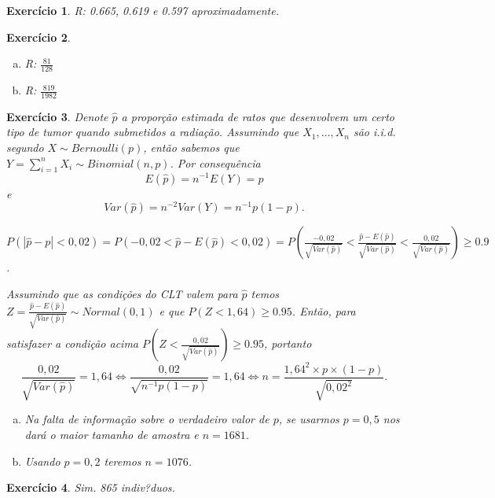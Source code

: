 \documentclass[letter,11pt]{article}
\newtheorem{exer}{Exercício}
\begin{document}
\medskip
\begin{exer} \rm %
 R: 0.665, 0.619 e 0.597 aproximadamente.
\end{exer}


\medskip
\begin{exer} \rm %

\begin{enumerate}[a)]
\item R: $\frac{81}{128}$
\item R: $\frac{819}{1982}$
\end{enumerate}
\end{exer}



\medskip
\begin{exer}\rm 
Denote $\hat{p}$ a proporção estimada de ratos que desenvolvem um certo tipo de tumor quando submetidos a radiação. Assumindo que $X_1, \ldots, X_n$ são i.i.d. segundo $X \sim Bernoulli(p)$, então sabemos que $Y = \sum_{i=1}^{n} X_i \sim Binomial(n,p)$. Por consequência 
$$E(\hat{p}) = n^{-1} E \left( Y \right) = p$$
e
$$Var(\hat{p}) = n^{-2} Var \left( Y \right) = n^{-1} p (1-p).$$

\noindent $P \left( \left| \hat{p} - p \right| < 0,02 \right) = P \left( -0,02 < \hat{p} - E(\hat{p}) < 0,02 \right) = P \left( \frac{-0,02}{\sqrt{Var(\hat{p})}} < \frac{\hat{p} - E(\hat{p})}{\sqrt{Var(\hat{p})}} < \frac{0,02}{\sqrt{Var(\hat{p})}} \right) \geq 0.9$. 

Assumindo que as condições do CLT valem para $\hat{p}$ temos $Z = \frac{\hat{p} - E(\hat{p})}{\sqrt{Var(\hat{p})}} \sim Normal(0,1)$ e que $P(Z < 1,64) \geq 0.95$. Então, para satisfazer a condição acima
$ P \left( Z < \frac{0,02}{\sqrt{Var(\hat{p})}} \right) \geq 0.95$, portanto
$$ \frac{0,02}{\sqrt{Var(\hat{p})}} = 1,64 \Leftrightarrow \frac{0,02}{\sqrt{n^{-1} p (1-p)}} = 1,64 \Leftrightarrow n = \frac{1,64^2 \times p \times (1-p)}{\sqrt{0,02^2}}.$$

\begin{enumerate}[a)]
\item Na falta de informação sobre o verdadeiro valor de $p$, se usarmos $p=0,5$ nos dará o maior tamanho de amostra
e $n = 1681$.
\item Usando $p=0,2$ teremos $n=1076$.
\end{enumerate}
\end{exer}
 
 
 
 
 
 \medskip
\begin{exer}\rm 
Sim. 865 indiv?duos. 
\end{exer}
\end{document}
